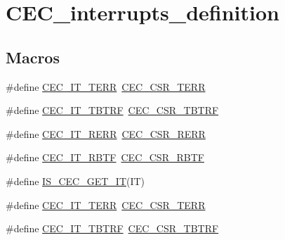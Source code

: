 \hypertarget{group___c_e_c__interrupts__definition}{}\section{C\+E\+C\+\_\+interrupts\+\_\+definition}
\label{group___c_e_c__interrupts__definition}
\subsection*{Macros}
\begin{DoxyCompactItemize}
\item 
\#define \hyperlink{group___c_e_c__interrupts__definition_ga25f97d245f29e04a2d2bbc840389e6b5}{C\+E\+C\+\_\+\+I\+T\+\_\+\+T\+E\+RR}~\hyperlink{group___peripheral___registers___bits___definition_ga273caacb035cb2ec64c721fa6c747c35}{C\+E\+C\+\_\+\+C\+S\+R\+\_\+\+T\+E\+RR}
\item 
\#define \hyperlink{group___c_e_c__interrupts__definition_ga12b00fb3989f9ce9f2f7fc0094c0747d}{C\+E\+C\+\_\+\+I\+T\+\_\+\+T\+B\+T\+RF}~\hyperlink{group___peripheral___registers___bits___definition_ga650bba50140fa01d98abe80bf004a9b6}{C\+E\+C\+\_\+\+C\+S\+R\+\_\+\+T\+B\+T\+RF}
\item 
\#define \hyperlink{group___c_e_c__interrupts__definition_gac015ebba728a69eeb84be1bc56a58ac0}{C\+E\+C\+\_\+\+I\+T\+\_\+\+R\+E\+RR}~\hyperlink{group___peripheral___registers___bits___definition_ga2e33f1d4724efa45fce87ae2fcba6cff}{C\+E\+C\+\_\+\+C\+S\+R\+\_\+\+R\+E\+RR}
\item 
\#define \hyperlink{group___c_e_c__interrupts__definition_ga42834131bf077a878e84470ae98f1bb4}{C\+E\+C\+\_\+\+I\+T\+\_\+\+R\+B\+TF}~\hyperlink{group___peripheral___registers___bits___definition_gaa325807f8f3d4bdf8e989eeef208ca5a}{C\+E\+C\+\_\+\+C\+S\+R\+\_\+\+R\+B\+TF}
\item 
\#define \hyperlink{group___c_e_c__interrupts__definition_ga7f553a4a3346c676101d81a024a9cba8}{I\+S\+\_\+\+C\+E\+C\+\_\+\+G\+E\+T\+\_\+\+IT}(IT)
\item 
\#define \hyperlink{group___c_e_c__interrupts__definition_ga25f97d245f29e04a2d2bbc840389e6b5}{C\+E\+C\+\_\+\+I\+T\+\_\+\+T\+E\+RR}~\hyperlink{group___peripheral___registers___bits___definition_ga273caacb035cb2ec64c721fa6c747c35}{C\+E\+C\+\_\+\+C\+S\+R\+\_\+\+T\+E\+RR}
\item 
\#define \hyperlink{group___c_e_c__interrupts__definition_ga12b00fb3989f9ce9f2f7fc0094c0747d}{C\+E\+C\+\_\+\+I\+T\+\_\+\+T\+B\+T\+RF}~\hyperlink{group___peripheral___registers___bits___definition_ga650bba50140fa01d98abe80bf004a9b6}{C\+E\+C\+\_\+\+C\+S\+R\+\_\+\+T\+B\+T\+RF}

\end{DoxyCompactItemize}
